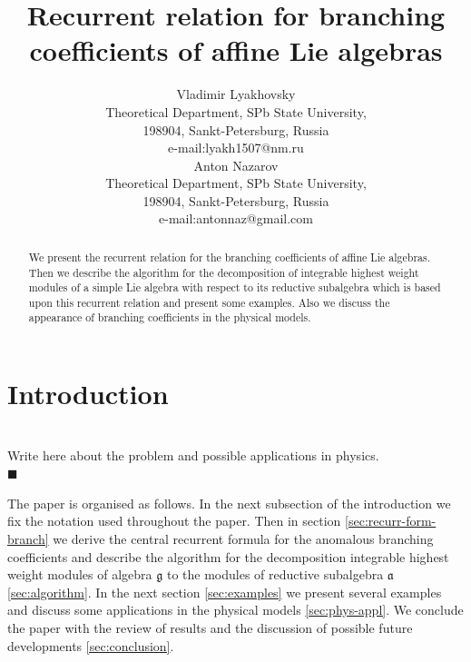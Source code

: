 \documentclass[a4paper,12pt]{article}
\theoremstyle{definition} \newtheorem{Def}{Definition}
\newenvironment{comment}
{\par\noindent{\bf TODO}\\}
{\\\hfill$\scriptstyle\blacksquare$\par}
\begin{document}
\title{\textbf{{\Large {Recurrent relation for branching coefficients of affine Lie algebras}}}}
\author{Vladimir Lyakhovsky\\
Theoretical Department, SPb State University,\\
198904, Sankt-Petersburg, Russia \\
e-mail:lyakh1507@nm.ru \\
[5mm] Anton Nazarov \\
Theoretical Department, SPb State University,\\
198904, Sankt-Petersburg, Russia \\
e-mail:antonnaz@gmail.com\\
}
\maketitle

\begin{abstract}
  We present the recurrent relation for the branching coefficients of affine Lie algebras. Then we describe the algorithm for the decomposition of  integrable highest weight modules
of a simple Lie algebra with respect to its reductive subalgebra which is based upon this recurrent relation and present some examples. Also we discuss the appearance of branching coefficients in the physical models.
\end{abstract}


\section{Introduction}
\label{sec:introduction}

\begin{comment}
  Write here about the problem and possible applications in physics.
\end{comment}

The paper is organised as follows. In the next subsection of the introduction we fix the notation used throughout the paper. Then in section \ref{sec:recurr-form-branch} we derive the central recurrent formula for the anomalous branching coefficients and describe the algorithm for the decomposition integrable highest weight modules of algebra $\mathfrak{g}$ to the modules of reductive subalgebra $\mathfrak{a}$ \ref{sec:algorithm}. In the next section \ref{sec:examples} we present several examples and discuss some applications in the physical models \ref{sec:phys-appl}. We conclude the paper with the review of results and the discussion of possible future developments \ref{sec:conclusion}.
\end{document}
